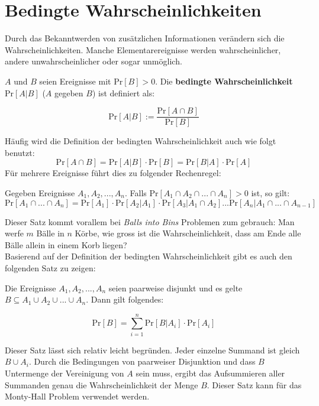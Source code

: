 \chapter{Bedingte Wahrscheinlichkeiten}

Durch das Bekanntwerden von zusätzlichen Informationen verändern sich die Wahrscheinlichkeiten. Manche
Elementarereignisse werden wahrscheinlicher, andere unwahrscheinlicher oder sogar unmöglich.

\begin{definition}
    $A$ und $B$ seien Ereignisse mit Pr$[B] > 0$. Die \textbf{bedingte Wahrscheinlichkeit} Pr$[A | B]$
    ($A$ gegeben $B$) ist definiert als:

    $$\text{Pr}[A | B] := \frac{\text{Pr}[A \cap B]}{\text{Pr}[B]}$$

\end{definition}
\bigskip

Häufig wird die Definition der bedingten Wahrscheinlichkeit auch wie folgt benutzt:
$$\text{Pr}[A \cap B] = \text{Pr}[A | B] \cdot \text{Pr}[B] = \text{Pr}[B | A] \cdot \text{Pr}[A]$$
Für mehrere Ereignisse führt dies zu folgender Rechenregel:

\begin{satz}[Multiplikationssatz]
    Gegeben Ereignisse $A_1, A_2, ... , A_n$. Falls Pr$[A_1 \cap A_2 \cap ... \cap A_n] > 0$ ist, so 
    gilt:
    $$\text{Pr}[A_1 \cap ... \cap A_n] = \text{Pr}[A_1] \cdot \text{Pr}[A_2 | A_1] \cdot \text{Pr}[A_3 | A_1 \cap A_2] ...\text{Pr}[A_n | A_1 \cap ... \cap A_{n-1}]$$
\end{satz}
\bigskip

Dieser Satz kommt vorallem bei \textit{Balls into Bins} Problemen zum gebrauch: Man werfe $m$ Bälle
in $n$ Körbe, wie gross ist die Wahrscheinlichkeit, dass am Ende alle Bälle allein in einem Korb liegen? \\

Basierend auf der Definition der bedingten Wahrscheinlichkeit gibt es auch den folgenden Satz zu zeigen:

\begin{satz}
    Die Ereignisse $A_1, A_2, ... , A_n$ seien paarweise disjunkt und es gelte $B \subseteq A_1 \cup A_2 \cup ... \cup A_n$.
    Dann gilt folgendes:

    $$\text{Pr}[B] = \sum_{i = 1}^{n}\text{Pr}[B | A_i]\cdot\text{Pr}[A_i]$$
\end{satz}
\bigskip

Dieser Satz lässt sich relativ leicht begründen. Jeder einzelne Summand ist gleich $B \cup A_i$. 
Durch die Bedingungen von paarweiser Disjunktion und dass $B$ Untermenge der Vereinigung von $A$ sein 
muss, ergibt das Aufsummieren aller Summanden genau die Wahrscheinlichkeit der Menge $B$. Dieser Satz 
kann für das Monty-Hall Problem verwendet werden. \\

